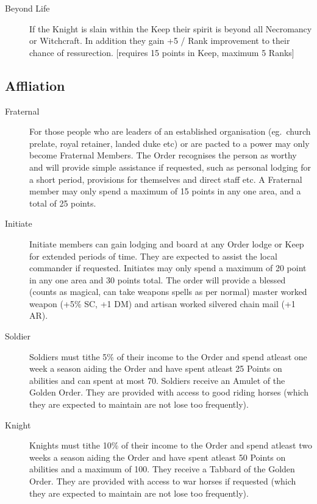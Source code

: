 \documentclass[a4paper]{article}
\begin{document}
\begin{multicols*}{3}
\begin{description}
\item[Beyond Life] If the Knight is slain within the Keep their spirit
  is beyond all Necromancy or Witchcraft.  In addition they gain +5\/%
  / Rank improvement to their chance of ressurection.  [requires 15
    points in Keep, maximum 5 Ranks]

\end{description}

\subsection{Affliation}

\begin{description}

\item[Fraternal] For those people who are leaders of an established
  organisation (eg.\ church prelate, royal retainer, landed duke etc)
  or are pacted to a power may only become Fraternal Members.  The
  Order recognises the person as worthy and will provide simple
  assistance if requested, such as personal lodging for a short
  period, provisions for themselves and direct staff etc.  A Fraternal
  member may only spend a maximum of 15 points in any one area, and a
  total of 25 points.

\item[Initiate] Initiate members can gain lodging and board at any
  Order lodge or Keep for extended periods of time.  They are expected
  to assist the local commander if requested.  Initiates may only
  spend a maximum of 20 point in any one area and 30 points total.
  The order will provide a blessed (counts as magical, can take
  weapons spells as per normal) master worked weapon (+5\% SC, +1 DM)
  and artisan worked silvered chain mail (+1 AR).

\item[Soldier] Soldiers must tithe 5\% of their income to the Order
  and spend atleast one week a season aiding the Order and have spent
  atleast 25 Points on abilities and can spent at most 70.  Soldiers
  receive an Amulet of the Golden Order.  They are provided with
  access to good riding horses (which they are expected to maintain
  are not lose too frequently).

\item[Knight] Knights must tithe 10\% of their income to the Order and
  spend atleast two weeks a season aiding the Order and have spent
  atleast 50 Points on abilities and a maximum of 100. They receive a
  Tabbard of the Golden Order.  They are provided with access to war
  horses if requested (which they are expected to maintain are not
  lose too frequently).


\end{description}
\end{multicols*}
\end{document}
